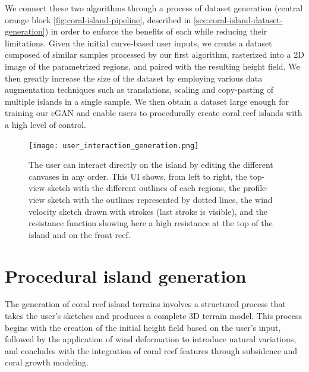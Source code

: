 We connect these two algorithms through a process of dataset generation (central orange block \cref{fig:coral-island-pipeline}, described in \cref{sec:coral-island-dataset-generation}) in order to enforce the benefits of each while reducing their limitations. Given the initial curve-based user inputs, we create a dataset composed of similar samples processed by our first algorithm, rasterized into a 2D image of the parametrized regions, and paired with the resulting height field. We then greatly increase the size of the dataset by employing various data augmentation techniques such as translations, scaling and copy-pasting of multiple islands in a single sample. We then obtain a dataset large enough for training our cGAN and enable users to procedurally create coral reef islands with a high level of control.


\begin{figure}
    \centering
    \texttt{[image: user\_interaction\_generation.png]}
    \caption{The user can interact directly on the island by editing the different canvases in any order. This UI shows, from left to right, the top-view sketch with the different outlines of each regions, the profile-view sketch with the outlines represented by dotted lines, the wind velocity sketch drawn with strokes (last stroke is visible), and the resistance function showing here a high resistance at the top of the island and on the front reef.}
    \label{fig:coral-island-wind-from-strokes-interaction}
\end{figure}


























\section{Procedural island generation}
\label{sec:coral-island-example-generation}

The generation of coral reef island terrains involves a structured process that takes the user's sketches and produces a complete 3D terrain model. This process begins with the creation of the initial height field based on the user's input, followed by the application of wind deformation to introduce natural variations, and concludes with the integration of coral reef features through subsidence and coral growth modeling.





